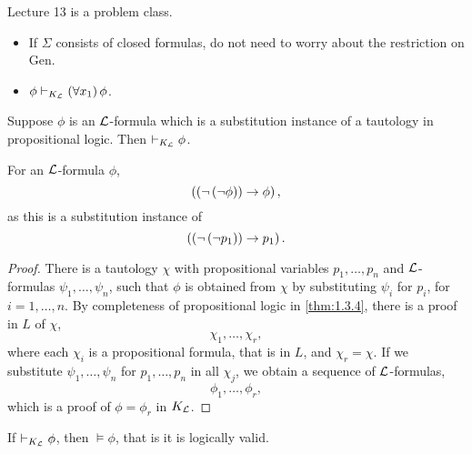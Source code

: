
Lecture 13 is a problem class.


\begin{remark}
\hfill
\begin{itemize}
\item If $ \Sigma $ consists of closed formulas, do not need to worry about the restriction on Gen.
\item $ \phi \vdash_{K_{\mathcal{L}}} \left( \forall x_1 \right)\phi $.
\end{itemize}
\end{remark}

\begin{theorem}
\label{thm:2.4.4}
Suppose $ \phi $ is an $ \mathcal{L} $-formula which is a substitution instance of a tautology in propositional logic. Then $ \vdash_{K_{\mathcal{L}}} \phi $.
\end{theorem}

\begin{example*}
For an $ \mathcal{L} $-formula $ \phi $,
$$ \left( \left( \neg \left( \neg \phi \right) \right) \rightarrow \phi \right), $$
as this is a substitution instance of
$$ \left( \left( \neg \left( \neg p_1 \right) \right) \rightarrow p_1 \right). $$
\end{example*}

\begin{proof}
There is a tautology $ \chi $ with propositional variables $ p_1, \dots, p_n $ and $ \mathcal{L} $-formulas $ \psi_1, \dots, \psi_n $, such that $ \phi $ is obtained from $ \chi $ by substituting $ \psi_i $ for $ p_i $, for $ i = 1, \dots, n $. By completeness of propositional logic in \ref{thm:1.3.4}, there is a proof in $ L $ of $ \chi $,
$$ \chi_1, \dots, \chi_r, $$
where each $ \chi_i $ is a propositional formula, that is in $ L $, and $ \chi_r = \chi $. If we substitute $ \psi_1, \dots, \psi_n $ for $ p_1, \dots, p_n $ in all $ \chi_j $, we obtain a sequence of $ \mathcal{L} $-formulas,
$$ \phi_1, \dots, \phi_r, $$
which is a proof of $ \phi = \phi_r $ in $ K_{\LL} $.
\end{proof}

\begin{theorem}[Soundness of $ K_{\LL} $]
If $ \vdash_{K_{\mathcal{L}}} \phi $, then $ \vDash \phi $, that is it is logically valid.
\end{theorem}


